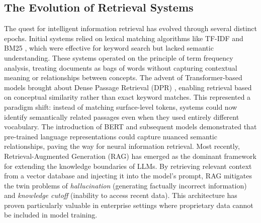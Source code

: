 \documentclass[conference]{IEEEtran}
\begin{document}
\subsection{The Evolution of Retrieval Systems}
The quest for intelligent information retrieval has evolved through several distinct epochs. Initial systems relied on lexical matching algorithms like TF-IDF \cite{salton1988term} and BM25 \cite{robertson2009probabilistic}, which were effective for keyword search but lacked semantic understanding. These systems operated on the principle of term frequency analysis, treating documents as bags of words without capturing contextual meaning or relationships between concepts.
The advent of Transformer-based models \cite{vaswani2017attention} brought about Dense Passage Retrieval (DPR) \cite{karpukhin2020dense}, enabling retrieval based on conceptual similarity rather than exact keyword matches. This represented a paradigm shift: instead of matching surface-level tokens, systems could now identify semantically related passages even when they used entirely different vocabulary. The introduction of BERT \cite{devlin2018bert} and subsequent models demonstrated that pre-trained language representations could capture nuanced semantic relationships, paving the way for neural information retrieval.
Most recently, Retrieval-Augmented Generation (RAG) \cite{lewis2020retrieval} has emerged as the dominant framework for extending the knowledge boundaries of LLMs. By retrieving relevant context from a vector database and injecting it into the model's prompt, RAG mitigates the twin problems of \textit{hallucination} (generating factually incorrect information) and \textit{knowledge cutoff} (inability to access recent data). This architecture has proven particularly valuable in enterprise settings where proprietary data cannot be included in model training.
\end{document}
